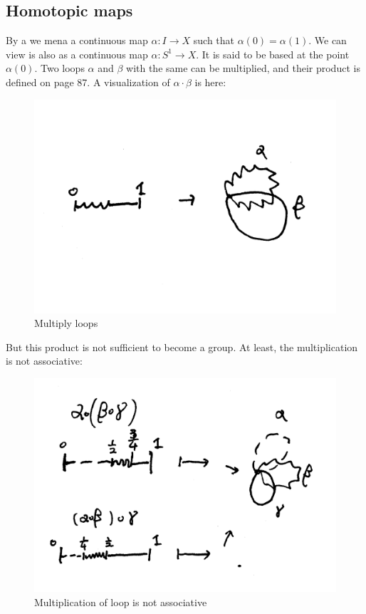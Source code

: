 
\subsection{Homotopic maps}
\label{sec:Homotopic-maps}

By a  we mena a continuous map $\alpha:I\to X$ such that
$\alpha(0)=\alpha(1)$. We can view is also as a continuous map
$\alpha:S^1 \to X$. It is said to be based at the point
$\alpha(0)$. Two loops $\alpha$ and $\beta$ with the same  can be multiplied, and their product is defined on page 87.
A visualization of $\alpha\cdot\beta$ is here:
\begin{figure}[H]
    \centering
    \includegraphics[width=0.4\linewidth]{pics/multiply-loops.pdf}
    \caption{Multiply loops}
\end{figure}
But this product is not sufficient to become a group. At least, the
multiplication is not associative:
\begin{figure}[H]
    \centering
    \includegraphics[width=0.6\linewidth]{pics/multiply-loop-not-associative.pdf}
    \caption{Multiplication of loop is not associative}
\end{figure}

